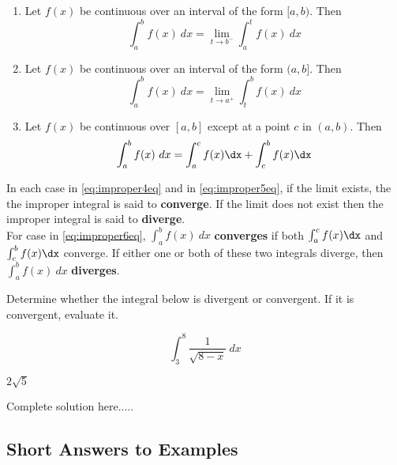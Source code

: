 \begin{tcolorbox}[title = {Definition}]

\begin{enumerate}
    \item Let $f(x)$ be continuous over an interval of the form $[a,b)$. Then
    \begin{equation}\label{eq:improper4eq}
        \int_a^{b} f(x)\ dx = \lim\limits_{t \to b^-} \int_a^t f(x) \ dx
    \end{equation}
   
    \item Let $f(x)$ be continuous over an interval of the form $(a,b]$. Then
    \begin{equation}\label{eq:improper5eq}
        \int_{a}^{b} f(x)\ dx = \lim\limits_{t \to a^+} \int_t^b f(x) \ dx
    \end{equation}
    
    \item Let $f(x)$ be continuous over $[a,b]$ except at  a point $c$ in $(a,b)$. Then
    \begin{equation}\label{eq:improper6eq}
        \int_{a}^{b} f(x) \ dx = \int_{a}^c f(x) \dx + \int_c^{b} f(x) \dx 
    \end{equation}
\end{enumerate}
\end{tcolorbox}
\noindent In each case in \ref{eq:improper4eq} and in \ref{eq:improper5eq}, if the limit exists, the the improper integral is said to \textbf{converge}. If the limit does not exist then the improper integral is said to \textbf{diverge}.\\
\noindent For case in \ref{eq:improper6eq}, $\int_{a}^{b} f(x) \ dx$ \textbf{converges} if both $\int_{a}^c f(x) \dx$ and $\int_c^{b} f(x) \dx$ converge. If either one or both of these two integrals diverge, then $\int_{a}^{b} f(x) \ dx$ \textbf{diverges}.

\begin{example}
Determine whether the integral below is divergent or convergent. If it is convergent, evaluate it. 

$$\int_{3}^{8} \frac{1}{\sqrt{8-x}}\ dx$$
    \begin{sol}
    $2\sqrt{5}$
    \end{sol}
    \begin{solL}
    Complete solution here.....
    
    \end{solL}
    
\end{example}





\vspace*{\fill}

\subsection*{Short Answers to Examples}



